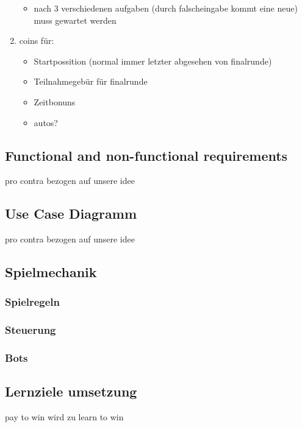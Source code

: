 \begin{enumerate}
\begin{itemize}
			\item{nach 3 verschiedenen aufgaben (durch falscheingabe kommt eine neue) muss gewartet werden}
		\end{itemize}
	\item{coins für:}
	\begin{itemize}
		\item{Startpossition (normal immer letzter abgesehen von finalrunde)}
		\item{Teilnahmegebür für finalrunde}
		\item{Zeitbonuns}
		\item{autos?}
	\end{itemize}
\end{enumerate}

\subsection{Functional and non-functional requirements}
	pro contra bezogen auf unsere idee
\subsection{Use Case Diagramm}
	pro contra bezogen auf unsere idee
\subsection{Spielmechanik}
	\subsubsection{Spielregeln}
	\subsubsection{Steuerung}
	\subsubsection{Bots}
\subsection{Lernziele umsetzung}
	pay to win  wird zu  learn to win
